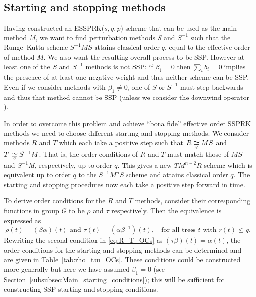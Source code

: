 \subsection{Starting and stopping methods}\label{subsec:starting_stopping}
Having constructed an ESSPRK($s,q,p$) scheme that can be used as the main 
method $M$, we want to find perturbation methods $S$ and $S^{-1}$ such that the 
Runge--Kutta scheme $S^{-1}MS$ attains classical order $q$, equal to the 
effective order of method $M$.
We also want the resulting overall process to be SSP.
However at least one of the $S$ and $S^{-1}$ methods is not SSP:
if $\beta_1 = 0$ then $\sum_i b_i = 0$ implies the presence of at
least one negative weight and thus neither scheme can be SSP.
Even if we consider methods with $\beta_1 \neq 0$, one of $S$ or
$S^{-1}$ must step backwards and thus that method cannot be SSP
(unless we consider the downwind operator
\cite{Ruuth2004,Gottlieb/Ruuth:SSPfastdownwind,Ketcheson:2011:downwind}).

In order to overcome this problem and achieve ``bona fide'' effective order 
SSPRK methods we need to choose different starting and stopping methods. 
We consider methods $R$ and $T$ which each take a positive step such that 
$R \equival{q} MS$ and $T \equival{q} S^{-1}M$.
That is, the order conditions of $R$ and $T$ must match those of
$MS$ and $S^{-1}M$, respectively, up to order $q$.
This gives a new $TM^{n-2}R$ scheme which is equivalent up to order $q$ 
to the $S^{-1}M^nS$ scheme and attains classical order $q$.
The starting and stopping procedures now each take a positive step forward 
in time.

To derive order conditions for the $R$ and $T$ methods, consider their
corresponding functions in group $G$ to be $\rho$ and $\tau$
respectively.
Then the equivalence is expressed as
\begin{equation} \label{eq:R_T_OCs}
    \rho(t) = (\beta\alpha)(t) \text{ and } \tau(t) = (\alpha\beta^{-1})(t), \quad \text{for all 
    trees $t$ with $r(t) \leq q$.}
\end{equation}
Rewriting the second condition in \eqref{eq:R_T_OCs} as 
$(\tau\beta)(t) = \alpha(t)$, the order conditions for the starting and stopping 
methods can be determined and are given in Table~\ref{tab:rho_tau_OCs}.
These conditions could be constructed more generally but here we have
assumed $\beta_1=0$ (see Section~\ref{subsubsec:Main_starting_conditions}); this
will be sufficient for constructing SSP starting and stopping
conditions.


